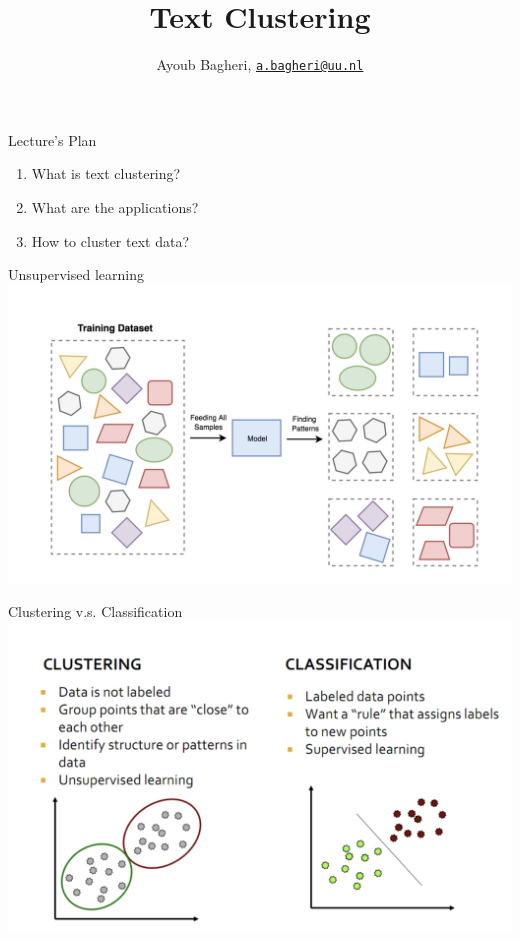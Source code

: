 \documentclass[
  ignorenonframetext,
]{beamer}
\title{Text Clustering}
\author{Ayoub Bagheri,
\href{mailto:a.bagheri@uu.nl}{\nolinkurl{a.bagheri@uu.nl}}}
\date{}
\begin{document}
\frame{\titlepage}

\begin{frame}{Lecture's Plan}
\protect\hypertarget{lectures-plan}{}
\begin{enumerate}
\item
  What is text clustering?
\item
  What are the applications?
\item
  How to cluster text data?
\end{enumerate}
\end{frame}

\begin{frame}{Unsupervised learning}
\protect\hypertarget{unsupervised-learning}{}
\includegraphics[width=1\linewidth]{img/page 3}
\end{frame}

\begin{frame}{Clustering v.s. Classification}
\protect\hypertarget{clustering-v.s.-classification}{}
\includegraphics[width=1\linewidth]{img/page 4}
\end{frame}
\end{document}
